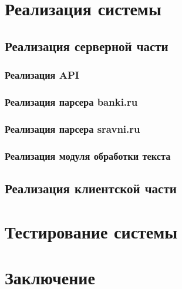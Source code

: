 \documentclass[PI, VKR]{HSEUniversity}
\begin{document}
\chapter{Реализация системы}
\label{sec:org914f078}
\section{Реализация серверной части}
\label{sec:orgfb328e9}
\subsection{Реализация API}
\label{sec:orgb5c650b}
\subsection{Реализация парсера banki.ru}
\label{sec:org620d7d2}
\subsection{Реализация парсера sravni.ru}
\label{sec:orgd3b59d8}
\subsection{Реализация модуля обработки текста}
\label{sec:org173ae97}
\section{Реализация клиентской части}
\label{sec:org167eceb}
\chapter{Тестирование системы}
\label{sec:org6a0c922}
\chapter*{Заключение}
\label{sec:org3202870}
\putbibliography
\appendix
\end{document}
